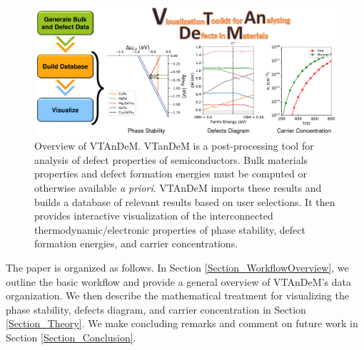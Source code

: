\documentclass[%
 reprint,
 amsmath,amssymb,
 aps,
]{revtex4-1}
\begin{document}

\begin{figure}
\centering
\includegraphics[scale=0.5]{VTAnDeM_Overview_v5.pdf}
\caption{Overview of VTAnDeM. 
VTanDeM is a post-processing tool for analysis of defect properties of semiconductors. 
Bulk materials properties and defect formation energies must be computed or otherwise available {\it a priori}. 
VTAnDeM imports these results and builds a database of relevant results based on user selections. 
It then provides interactive visualization of the interconnected thermodynamic/electronic properties of phase stability, defect formation energies, and carrier concentrations.}
\label{Figure:VTAnDeM_Overview}
\end{figure}

The paper is organized as follows. In Section \ref{Section_WorkflowOverview}, we outline the basic workflow and provide a general overview of VTAnDeM's data organization. We then describe the mathematical treatment for visualizing the phase stability, defects diagram, and carrier concentration in Section \ref{Section_Theory}. We make concluding remarks and comment on future work in Section \ref{Section_Conclusion}.
\end{document}
